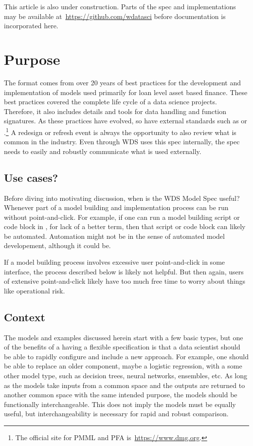 \documentclass[10pt]{article}
\begin{document}
This article is also under construction.  Parts of the spec and implementations may be available at~\url{https://github.com/wdatasci} before
documentation is incorporated here.

\fi

\section{Purpose\label{purpose}}

The  format comes from over 20 years of best practices for the development and implementation of models used primarily for
loan level asset based finance.  These best practices covered the complete life cycle of a data science projects.  Therefore, it also
includes details and tools for data handling and function signatures.  As these practices have evolved, so have external standards such as
 or .\footnote{The official site for PMML and PFA is~\url{https://www.dmg.org}.} A redesign or refresh event is always the
opportunity to also review what is common in the industry.   Even through WDS uses this spec internally, the spec needs to easily and
robustly communicate what is used externally.

\subsection{Use cases?}

Before diving into motivating discussion, when is the WDS Model Spec useful?  Whenever part of a model building and implementation process
can be run without point-and-click.  For example, if one can run a model building script or code block in , for lack 
of a better term, then that script or code block can likely be automated.  Automation might not be in the sense of automated model
developement, although it could be.  

If a model building process involves excessive user point-and-click in some interface, the process described below is likely not helpful.
But then again, users of extensive point-and-click likely have too much free time to worry about things like operational risk.

\subsection{Context}


The models and examples discussed herein start with a few basic types, but one of the benefits of a having a flexible
specification is that a data scientist should be able to rapidly configure and include a new approach.  For example, one should be able to
replace an older component, maybe a logistic regression, with a some other model type, such as decision trees, neural networks, ensembles,
etc. As long as the models take inputs from a common space and the outputs are returned to another common space with the same intended
purpose, the models should be functionally interchangeable.  This does not imply the models must be  equally useful, but interchangeability
is necessary for rapid and robust comparison.
\end{document}
